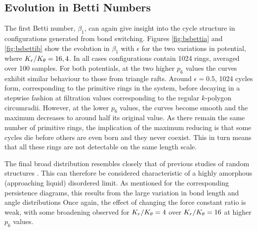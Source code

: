\subsection{Evolution in Betti Numbers}

The first Betti number, $\beta_1$, can again give insight into the cycle structure in configurations generated from bond switching.
Figures \ref{fig:bsbettia} and \ref{fig:bsbettib} show the evolution in $\beta_1$ with $\epsilon$ for the two variations in potential, where $K_r/K_\theta = 16,4$.
In all cases configurations contain 1024 rings, averaged over 100 samples. 
For both potentials, at the two higher $p_6$ values the curves exhibit similar behaviour to those from triangle rafts.
Around $\epsilon=0.5$, 1024 cycles form, corresponding to the primitive rings in the system, before decaying in a stepwise fashion at filtration values corresponding to the regular $k$\--polygon circumradii.
However, at the lower $p_6$ values, the curves become smooth and the maximum decreases to around half its original value.
As there remain the same number of primitive rings, the implication of the maximum reducing is that some cycles die before others are even born and they never coexist.
This in turn means that all these rings are not detectable on the same length scale.

The final broad distribution resembles closely that of previous studies of random structures \cite{Nakamura2015}.
This can therefore be considered characteristic of a highly amorphous (approaching liquid) disordered limit.
As mentioned for the corresponding persistence diagrams, this results from the large variation in bond length and angle distributions %
Once again, the effect of changing the force constant ratio is weak, with some broadening observed for $K_r/K_\theta=4$ over $K_r/K_\theta=16$ at higher $p_6$ values.

